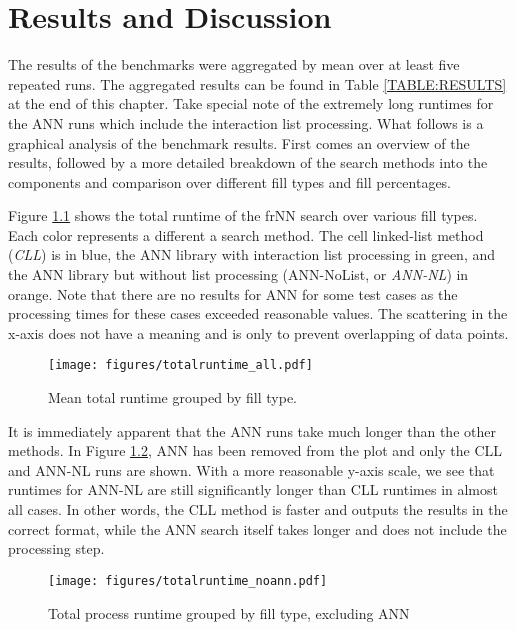 

\chapter{Results and Discussion}

The results of the benchmarks were aggregated by mean over at least five repeated runs. The aggregated results can be found in Table \ref{TABLE:RESULTS} at the end of this chapter. Take special note of the extremely long runtimes for the ANN runs which include the interaction list processing. What follows is a graphical analysis of the benchmark results. First comes an overview of the results, followed by a more detailed breakdown of the search methods into the components and comparison over different fill types and fill percentages.

Figure \ref{FIG:runtimeall} shows the total runtime of the frNN search over various fill types. Each color represents a different a search method. The cell linked-list method ({\itshape CLL}) is in blue, the ANN library with interaction list processing in green, and the ANN library but without list processing (ANN-NoList, or {\itshape ANN-NL}) in orange. Note that there are no results for ANN for some test cases as the processing times for these cases exceeded reasonable values. The scattering in the x-axis does not have a meaning and is only to prevent overlapping of data points.

\begin{figure}[h]
	\centering
	\texttt{[image: figures/totalruntime\_all.pdf]}
	\caption{Mean total runtime grouped by fill type.}
	\label{FIG:runtimeall}
\end{figure}

It is immediately apparent that the ANN runs take much longer than the other methods. In Figure \ref{FIG:runtimenoann}, ANN has been removed from the plot and only the CLL and ANN-NL runs are shown. With a more reasonable y-axis scale, we see that runtimes for ANN-NL are still significantly longer than CLL runtimes in almost all cases. In other words, the CLL method is faster and outputs the results in the correct format, while the ANN search itself takes longer and does not include the processing step.

\begin{figure}[h]
	\centering
	\texttt{[image: figures/totalruntime\_noann.pdf]}
	\caption{Total process runtime grouped by fill type, excluding ANN}
	\label{FIG:runtimenoann}
\end{figure}


